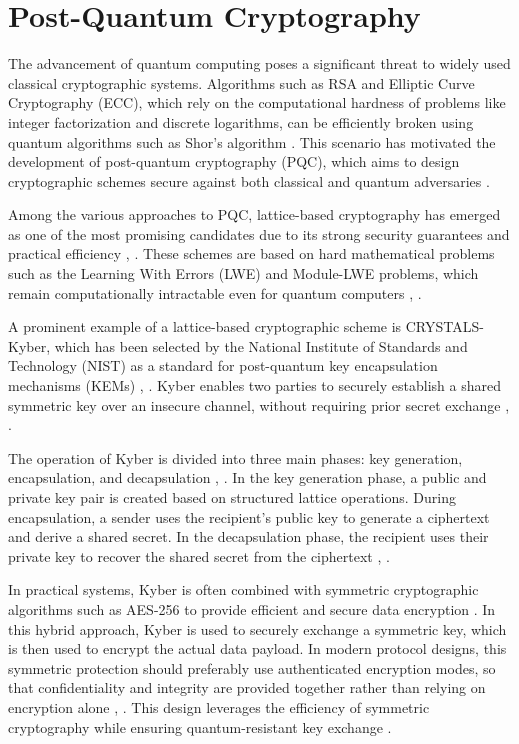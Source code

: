 \documentclass[
  12pt,
  oneside,
  a4paper,
  chapter=TITLE,
  section=TITLE,
  english,
  brazil
]{abntex2}
\begin{document}
\section{Post-Quantum Cryptography}

The advancement of quantum computing poses a significant threat to widely used classical cryptographic systems. Algorithms such as RSA and Elliptic Curve Cryptography (ECC), which rely on the computational hardness of problems like integer factorization and discrete logarithms, can be efficiently broken using quantum algorithms such as Shor's algorithm \cite{shor1997quantum}. This scenario has motivated the development of post-quantum cryptography (PQC), which aims to design cryptographic schemes secure against both classical and quantum adversaries \cite{shor1997quantum}.

Among the various approaches to PQC, lattice-based cryptography has emerged as one of the most promising candidates due to its strong security guarantees and practical efficiency \cite{regev2009lwe}, \cite{bos2017kyber}. These schemes are based on hard mathematical problems such as the Learning With Errors (LWE) and Module-LWE problems, which remain computationally intractable even for quantum computers \cite{regev2009lwe}, \cite{bos2017kyber}.

A prominent example of a lattice-based cryptographic scheme is CRYSTALS-Kyber, which has been selected by the National Institute of Standards and Technology (NIST) as a standard for post-quantum key encapsulation mechanisms (KEMs) \cite{bos2017kyber}, \cite{nist2024fips203}. Kyber enables two parties to securely establish a shared symmetric key over an insecure channel, without requiring prior secret exchange \cite{bos2017kyber}, \cite{nist2024fips203}.

The operation of Kyber is divided into three main phases: key generation, encapsulation, and decapsulation \cite{bos2017kyber}, \cite{nist2024fips203}. In the key generation phase, a public and private key pair is created based on structured lattice operations. During encapsulation, a sender uses the recipient's public key to generate a ciphertext and derive a shared secret. In the decapsulation phase, the recipient uses their private key to recover the shared secret from the ciphertext \cite{bos2017kyber}, \cite{nist2024fips203}.

In practical systems, Kyber is often combined with symmetric cryptographic algorithms such as AES-256 to provide efficient and secure data encryption \cite{bos2017kyber}. In this hybrid approach, Kyber is used to securely exchange a symmetric key, which is then used to encrypt the actual data payload. In modern protocol designs, this symmetric protection should preferably use authenticated encryption modes, so that confidentiality and integrity are provided together rather than relying on encryption alone \cite{bos2017kyber}, \cite{rfc8452}. This design leverages the efficiency of symmetric cryptography while ensuring quantum-resistant key exchange \cite{bos2017kyber}.
\end{document}
